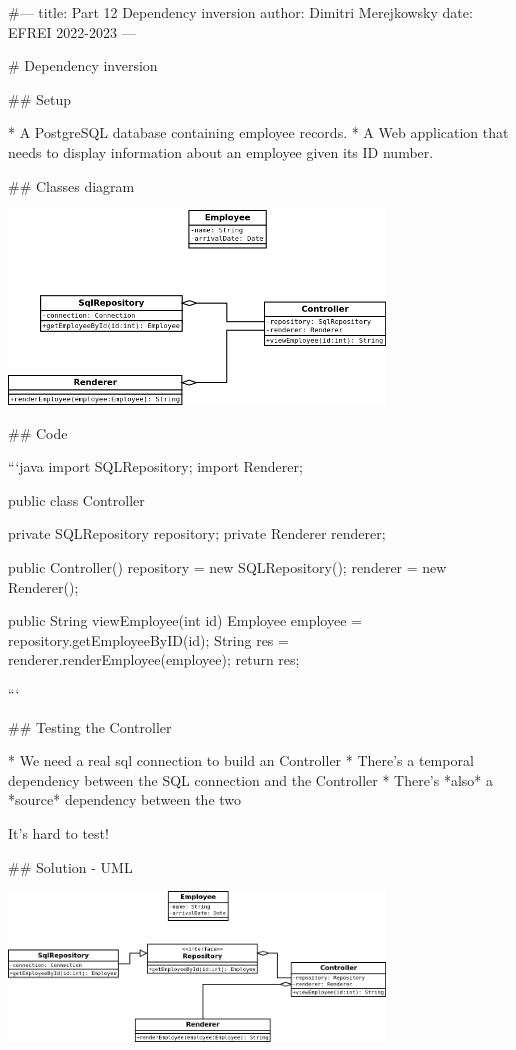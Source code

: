 #---
title: Part 12 Dependency inversion
author: Dimitri Merejkowsky
date: EFREI 2022-2023
---


# Dependency inversion

## Setup

* A PostgreSQL database containing employee records.
* A Web application that needs to display information about an employee
  given its ID number.

## Classes diagram

\includegraphics[width=10cm]{img/uml/employee-render-1.png}

## Code


```java
import SQLRepository;
import Renderer;

public class Controller {
    private SQLRepository repository;
    private Renderer renderer;

    public Controller() {
        repository = new SQLRepository();
        renderer = new Renderer();
    }

    public String viewEmployee(int id) {
        Employee employee = repository.getEmployeeByID(id);
        String res = renderer.renderEmployee(employee);
        return res;
    }
}
```

## Testing the Controller

* We need a real sql connection to build an Controller
* There's a temporal dependency between the SQL connection and the Controller
* There's *also* a *source* dependency between the two

\vfill

It's hard to test!

## Solution - UML


\includegraphics[width=10cm]{img/uml/employee-render-2.png}

